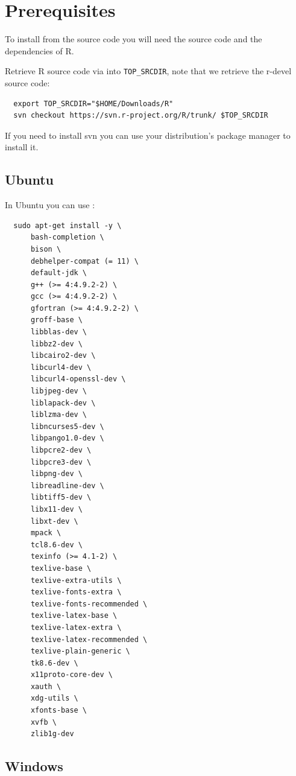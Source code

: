 \documentclass[
]{book}
\begin{document}
\hypertarget{prerequisites}{%
\section{Prerequisites}\label{prerequisites}}

To install from the source code you will need the source code and the dependencies of R.

Retrieve R source code via into \texttt{TOP\_SRCDIR}, note that we retrieve the r-devel source code:

\begin{verbatim}
  export TOP_SRCDIR="$HOME/Downloads/R"
  svn checkout https://svn.r-project.org/R/trunk/ $TOP_SRCDIR
\end{verbatim}

If you need to install svn you can use your distribution's package manager to install it.

\hypertarget{ubuntu}{%
\subsection{Ubuntu}\label{ubuntu}}

In Ubuntu you can use :

\begin{verbatim}
  sudo apt-get install -y \
      bash-completion \
      bison \
      debhelper-compat (= 11) \
      default-jdk \
      g++ (>= 4:4.9.2-2) \
      gcc (>= 4:4.9.2-2) \
      gfortran (>= 4:4.9.2-2) \
      groff-base \
      libblas-dev \
      libbz2-dev \
      libcairo2-dev \
      libcurl4-dev \
      libcurl4-openssl-dev \
      libjpeg-dev \
      liblapack-dev \
      liblzma-dev \
      libncurses5-dev \
      libpango1.0-dev \
      libpcre2-dev \
      libpcre3-dev \
      libpng-dev \
      libreadline-dev \
      libtiff5-dev \
      libx11-dev \
      libxt-dev \
      mpack \
      tcl8.6-dev \
      texinfo (>= 4.1-2) \
      texlive-base \
      texlive-extra-utils \
      texlive-fonts-extra \
      texlive-fonts-recommended \
      texlive-latex-base \
      texlive-latex-extra \
      texlive-latex-recommended \
      texlive-plain-generic \
      tk8.6-dev \
      x11proto-core-dev \
      xauth \
      xdg-utils \
      xfonts-base \
      xvfb \
      zlib1g-dev
\end{verbatim}

\hypertarget{windows}{%
\subsection{Windows}\label{windows}}
\end{document}
